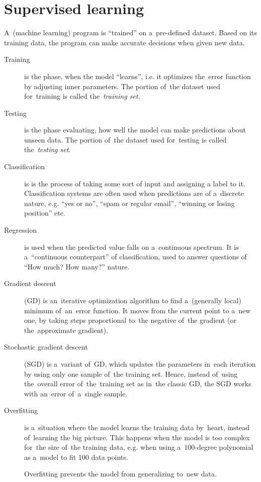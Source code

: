 \documentclass[a4paper,10pt]{article}
\begin{document}
\section{Supervised learning}
A~(machine learning) program is ``trained'' on a~pre-defined dataset.
Based on its training data, the program can make accurate decisions when given new data.
\begin{description}
  \item [Training] is the phase, when the model ``learns'', i.e. it optimizes the~error function by adjusting inner parameters.
    The portion of~the dataset used for~training is called the~\emph{training set}.
  \item [Testing] is the phase evaluating, how well the model can make predictions about unseen data.
    The portion of~the dataset used for~testing is called the~\emph{testing set}.
  \item [Classification] is is the process of taking some sort of input and assigning a label to it.
    Classification systems are often used when predictions are of a~discrete nature, e.g. ``yes or no'', ``spam or regular email'', ``winning or losing position'' etc.
  \item [Regression] is used when the predicted value falls on a~continuous spectrum.
    It is a~``continuous counterpart'' of classification, used to answer questions of ``How much? How many?'' nature.
  \item [Gradient descent] (GD) is an~iterative optimization algorithm to find a~(generally local) minimum of~an~error function.
    It moves from the current point to a~new one, by taking steps proportional to~the negative of~the gradient (or the~approximate gradient).
  \item [Stochastic gradient descent] (SGD) is a~variant of~GD, which updates the parameters in~each iteration by using only one sample of~the training set.
    Hence, instead of~using the~overall error of~the~training set as in~the classic GD, the SGD works with an~error of~a~single sample.
  \item [Overfitting] is a~situation where the model learns the training data by~heart, instead of~learning the big picture.
    This happens when the model is too complex for~the size of~the training data, e.g. when using a~$100$-degree polynomial as a~model to fit 100 data points.

    Overfitting prevents the model from generalizing to~new data.
\end{description}
\end{document}
